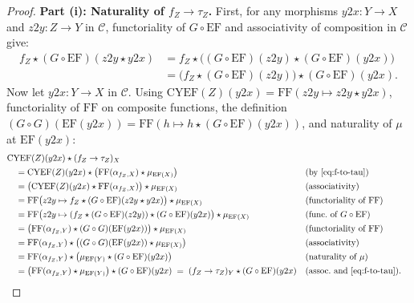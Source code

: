 \documentclass[11pt,a4paper]{article}
\theoremstyle{definition}
\theoremstyle{remark}
\newcommand{\CYEF}{\mathrm{CYEF}}
\newcommand{\FF}{\mathrm{FF}}
\newcommand{\EF}{\mathrm{EF}}
\begin{document}
\begin{proof}

\textbf{Part (i): Naturality of $f_Z \to \tau_Z$.}
First, for any morphisms $y2x : Y \to X$ and $z2y : Z \to Y$ in $\mathcal{C}$, functoriality of
$G \circ \EF$ and associativity of composition in $\mathcal{C}$ give:
\begin{align*}
  f_Z \star (G\circ\EF)(z2y \star y2x)
  &= f_Z \star \bigl((G\circ\EF)(z2y) \star (G\circ\EF)(y2x)\bigr) \\
  &= \bigl(f_Z \star (G\circ\EF)(z2y)\bigr) \star (G\circ\EF)(y2x).
\end{align*}
Now let $y2x : Y \to X$ in $\mathcal{C}$. Using $\CYEF(Z)(y2x) = \FF(z2y \mapsto z2y \star y2x)$,
functoriality of $\FF$ on composite functions, the definition
$(G \circ G)(\EF(y2x)) = \FF(h \mapsto h \star (G\circ\EF)(y2x))$, and naturality of $\mu$ at
$\EF(y2x)$:
\begin{align*}
  &\CYEF(Z)(y2x) \star (f_Z \to \tau_Z)_X \\
  &\quad= \CYEF(Z)(y2x) \star \bigl(\FF(\alpha_{f_Z, X}) \star \mu_{\EF(X)}\bigr)
    &&\text{(by \eqref{eq:f-to-tau})} \\
  &\quad= \bigl(\CYEF(Z)(y2x) \star \FF(\alpha_{f_Z, X})\bigr) \star \mu_{\EF(X)}
    &&\text{(associativity)} \\
  &\quad= \FF\bigl(z2y \mapsto f_Z \star (G\circ\EF)(z2y \star y2x)\bigr) \star \mu_{\EF(X)}
    &&\text{(functoriality of $\FF$)} \\
  &\quad= \FF\bigl(z2y \mapsto (f_Z \star (G\circ\EF)(z2y)) \star (G\circ\EF)(y2x)\bigr) \star \mu_{\EF(X)}
    &&\text{(func.\ of $G \circ \EF$)} \\
  &\quad= \bigl(\FF(\alpha_{f_Z, Y}) \star (G \circ G)(\EF(y2x))\bigr) \star \mu_{\EF(X)}
    &&\text{(functoriality of $\FF$)} \\
  &\quad= \FF(\alpha_{f_Z, Y}) \star \bigl((G \circ G)(\EF(y2x)) \star \mu_{\EF(X)}\bigr)
    &&\text{(associativity)} \\
  &\quad= \FF(\alpha_{f_Z, Y}) \star \bigl(\mu_{\EF(Y)} \star (G\circ\EF)(y2x)\bigr)
    &&\text{(naturality of $\mu$)} \\
  &\quad= \bigl(\FF(\alpha_{f_Z, Y}) \star \mu_{\EF(Y)}\bigr) \star (G\circ\EF)(y2x)
   \;=\; (f_Z \to \tau_Z)_Y \star (G\circ\EF)(y2x)
    &&\text{(assoc.\ and \eqref{eq:f-to-tau})}.
\end{align*}


\end{proof}
\end{document}
